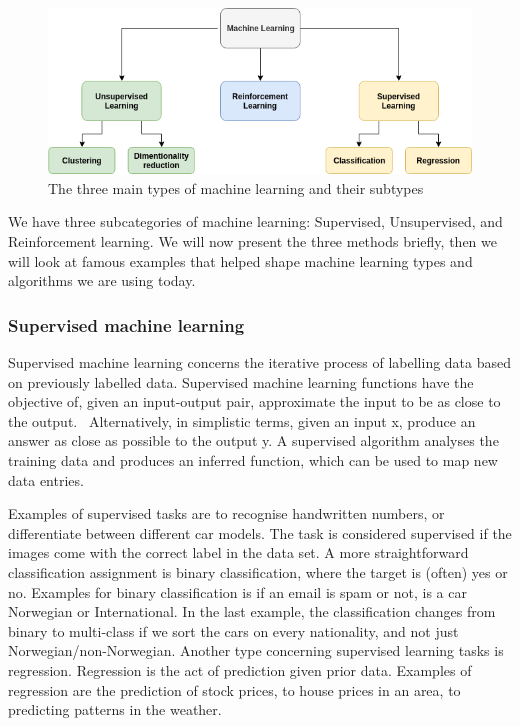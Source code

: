     \begin{figure}[h]
        \centering
        \includegraphics[scale=0.6]{background/figures/ML_types.png}
        \caption{The three main types of machine learning and their subtypes}
    \label{fig:ML_types} 
    \end{figure}

We have three subcategories of machine learning: Supervised, Unsupervised, and Reinforcement learning. 
We will now present the three methods briefly, then we will look at famous examples that helped shape machine learning types and algorithms we are using today.

\subsubsection{Supervised machine learning}
Supervised machine learning concerns the iterative process of labelling data based on previously labelled data.  Supervised machine learning functions have the objective of, given an input-output pair, approximate the input to be as close to the output.~\cite{AI:ModernApproach} Alternatively, in simplistic terms, given an input x, produce an answer as close as possible to the output y.
A supervised algorithm analyses the training data and produces an inferred function, which can be used to map new data entries. 


Examples of supervised tasks are to recognise handwritten numbers, or differentiate between different car models. The task is considered supervised if the images come with the correct label in the data set. 
A more straightforward classification assignment is binary classification, where the target is (often) yes or no. Examples for binary classification is if an email is spam or not, is a car Norwegian or International. In the last example, the classification changes from binary to multi-class if we sort the cars on every nationality, and not just Norwegian/non-Norwegian. Another type concerning supervised learning tasks is regression. Regression is the act of prediction given prior data. Examples of regression are the prediction of stock prices, to house prices in an area, to predicting patterns in the weather.

